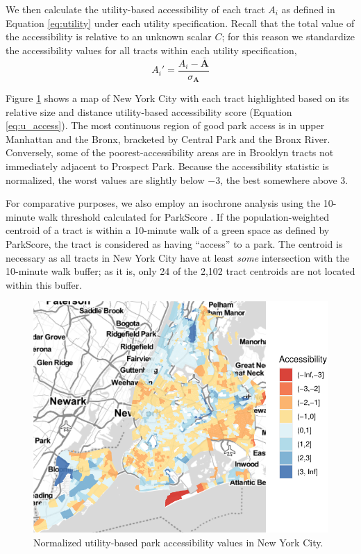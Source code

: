 \documentclass[shortAfour,sageh.bst]{sagej}
\begin{document}
We then calculate the utility-based accessibility of each tract \(A_i\)
as defined in Equation \ref{eq:utility} under each utility
specification. Recall that the total value of the accessibility is
relative to an unknown scalar \(C\); for this reason we standardize the
accessibility values for all tracts within each utility specification,
\begin{equation}\label{eq:v_logged}
A_i' = \frac{A_i - \bar{\boldsymbol{A}}}
            {\sigma_{\boldsymbol{A}}}
\end{equation}

Figure \ref{fig:map} shows a map of New York City with each tract
highlighted based on its relative size and distance utility-based
accessibility score (Equation \ref{eq:u_access}). The most continuous
region of good park access is in upper Manhattan and the Bronx,
bracketed by Central Park and the Bronx River. Conversely, some of the
poorest-accessibility areas are in Brooklyn tracts not immediately
adjacent to Prospect Park. Because the accessibility statistic is
normalized, the worst values are slightly below \(-3\), the best
somewhere above \(3\).

For comparative purposes, we also employ an isochrone analysis using the
10-minute walk threshold calculated for ParkScore \citep{parkscore2019}.
If the population-weighted centroid of a tract is within a 10-minute
walk of a green space as defined by ParkScore, the tract is considered
as having ``access'' to a park. The centroid is necessary as all tracts
in New York City have at least \emph{some} intersection with the
10-minute walk buffer; as it is, only 24 of the 2,102 tract centroids
are not located within this buffer.

\begin{figure}
\includegraphics{map-1} \caption{Normalized utility-based park accessibility values in New York City.}\label{fig:map}
\end{figure}
\end{document}
